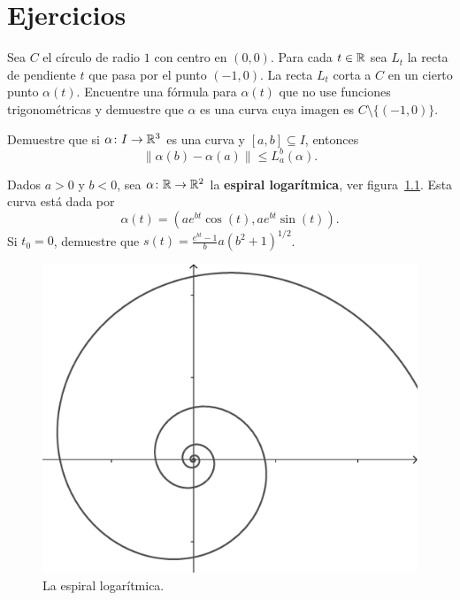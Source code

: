 
\chapter{Ejercicios}

\begin{exercise}
	\label{xca:L_t}
	Sea $C$ el círculo de radio $1$ con centro en $(0,0)$. Para cada $t\in\mathbb{R}$
	sea $L_t$ la recta de pendiente $t$ que pasa por el punto $(-1,0)$. La
	recta $L_t$ corta a $C$ en un cierto punto $\alpha(t)$. Encuentre una
	fórmula para $\alpha(t)$ que no use funciones trigonométricas y demuestre
	que $\alpha$ es una curva cuya imagen es $C\setminus\{(-1,0)\}$.
\end{exercise}

\begin{exercise}
	\label{xca:minima_distancia}
	Demuestre que si $\alpha\colon I\to\mathbb{R}^3$ es una curva y $[a,b]\subseteq I$,
	entonces 
	\[
		\|\alpha(b)-\alpha(a)\|\leq L_a^b(\alpha).
	\]
\end{exercise}

\begin{exercise}
	\label{xca:espiral_log}
	Dados $a>0$ y $b<0$, sea $\alpha\colon\mathbb{R}\to\mathbb{R}^2$ 
	la \textbf{espiral logarítmica}, ver figura~\ref{fig:log_spiral}. Esta curva 
	está dada por 
	\[
		\alpha(t)=(ae^{bt}\cos(t),ae^{bt}\sin(t)).
	\]
	Si $t_0=0$, demuestre que $s(t)=\frac{e^{bt}-1}{b}a(b^2+1)^{1/2}$. 
	\begin{figure}
		\centering
    	\includegraphics[scale=0.25]{eps/logspiral}
		\caption{La espiral logarítmica.}
		\label{fig:log_spiral}
	\end{figure}
\end{exercise}

